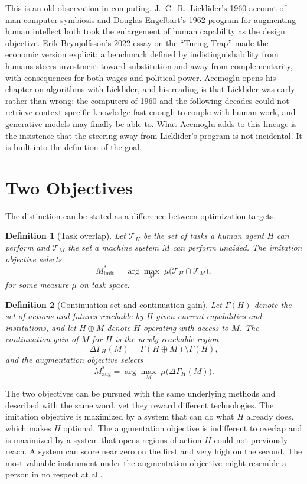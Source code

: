 \documentclass[11pt]{article}
\newtheorem{definition}{Definition}
\begin{document}
This is an old observation in computing. J.~C.~R.~Licklider's 1960 account of man-computer symbiosis and Douglas Engelbart's 1962 program for augmenting human intellect both took the enlargement of human capability as the design objective. Erik Brynjolfsson's 2022 essay on the ``Turing Trap'' made the economic version explicit: a benchmark defined by indistinguishability from humans steers investment toward substitution and away from complementarity, with consequences for both wages and political power. Acemoglu opens his chapter on algorithms with Licklider, and his reading is that Licklider was early rather than wrong: the computers of 1960 and the following decades could not retrieve context-specific knowledge fast enough to couple with human work, and generative models may finally be able to. What Acemoglu adds to this lineage is the insistence that the steering away from Licklider's program is not incidental. It is built into the definition of the goal.

\section{Two Objectives}
\label{sec:objectives}

The distinction can be stated as a difference between optimization targets.

\begin{definition}[Task overlap]
Let $\mathcal{T}_H$ be the set of tasks a human agent $H$ can perform and $\mathcal{T}_M$ the set a machine system $M$ can perform unaided. The \emph{imitation objective} selects
\[
M^{*}_{\mathrm{imit}} = \arg\max_M \; \mu\big(\mathcal{T}_H \cap \mathcal{T}_M\big),
\]
for some measure $\mu$ on task space.
\end{definition}

\begin{definition}[Continuation set and continuation gain]
Let $\Gamma(H)$ denote the set of actions and futures reachable by $H$ given current capabilities and institutions, and let $H \oplus M$ denote $H$ operating with access to $M$. The \emph{continuation gain} of $M$ for $H$ is the newly reachable region
\[
\Delta\Gamma_H(M) = \Gamma(H \oplus M) \setminus \Gamma(H),
\]
and the \emph{augmentation objective} selects
\[
M^{*}_{\mathrm{aug}} = \arg\max_M \; \mu\big(\Delta\Gamma_H(M)\big).
\]
\end{definition}

The two objectives can be pursued with the same underlying methods and described with the same word, yet they reward different technologies. The imitation objective is maximized by a system that can do what $H$ already does, which makes $H$ optional. The augmentation objective is indifferent to overlap and is maximized by a system that opens regions of action $H$ could not previously reach. A system can score near zero on the first and very high on the second. The most valuable instrument under the augmentation objective might resemble a person in no respect at all.
\end{document}
